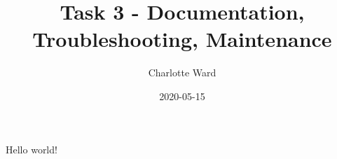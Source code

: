 \documentclass{article}
\title{Task 3 - Documentation, Troubleshooting, Maintenance}
\date{2020-05-15}
\author{Charlotte Ward}
\begin{document}
  \maketitle
  \newpage

Hello world!
\end{document}
